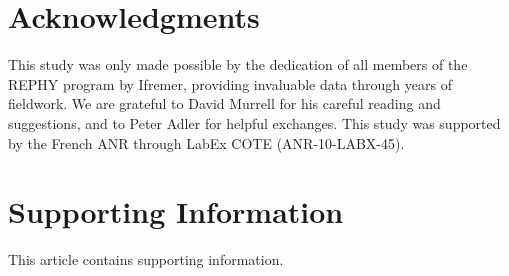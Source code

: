 \documentclass[10pt]{article}
\begin{document}

\section*{Acknowledgments}

This study was only made possible by the dedication of all members
of the REPHY program \citep{REPHY_db} by Ifremer, providing invaluable
data through years of fieldwork. We are grateful to David Murrell
for his careful reading and suggestions, and to Peter Adler for helpful
exchanges. This study was supported by the French ANR through LabEx
COTE (ANR-10-LABX-45).

\section*{Supporting Information}
This article contains supporting information.

\nolinenumbers
%


%
\end{document}
